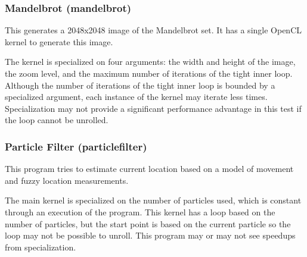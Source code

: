 \documentclass{acm_proc_article-sp}
\begin{document}
\subsubsection{Mandelbrot (mandelbrot)}

This generates a 2048x2048 image of the Mandelbrot set. It has a single OpenCL
kernel to generate this image.

The kernel is specialized on four arguments: the width and height of the image,
the zoom level, and the maximum number of iterations of the tight inner loop.
Although the number of iterations of the tight inner loop is bounded by a
specialized argument, each instance of the kernel may iterate less times.
Specialization may not provide a significant performance advantage in this test
if the loop cannot be unrolled.

\subsubsection{Particle Filter (particlefilter)}

This program tries to estimate current location based on a model of movement
and fuzzy location measurements. 

The main kernel is specialized on the number of particles used, which is
constant through an execution of the program. This kernel has a loop based on
the number of particles, but the start point is based on the current particle
so the loop may not be possible to unroll. This program may or may not see
speedups from specialization.






\balancecolumns
\end{document}
